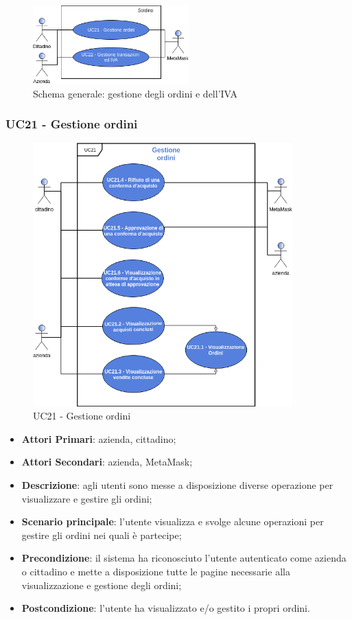 \begin{figure}[h]
	\includegraphics[width=6cm]{res/images/UC-Gestione.png}
	\centering
	\caption{Schema generale: gestione degli ordini e dell'IVA}
\end{figure}
\subsubsection{UC21 - Gestione ordini}
\begin{figure}[h]
	\includegraphics[width=10cm]{res/images/UC21.png}
	\centering
	\caption{UC21 - Gestione ordini}
\end{figure}
\begin{itemize}
	\item \textbf{Attori Primari}: azienda, cittadino;
		\item \textbf{Attori Secondari}: azienda, MetaMask\glo;
	\item \textbf{Descrizione}: agli utenti sono messe a disposizione diverse operazione per visualizzare e gestire gli ordini;
	\item \textbf{Scenario principale}: l'utente visualizza e svolge alcune operazioni per gestire gli ordini nei quali è partecipe;
	\item \textbf{Precondizione}: il sistema ha riconosciuto l'utente autenticato come azienda o cittadino e mette a disposizione tutte le pagine necessarie alla visualizzazione e gestione degli ordini;
	\item \textbf{Postcondizione}: l'utente ha visualizzato e/o gestito i propri ordini.
\end{itemize} 
